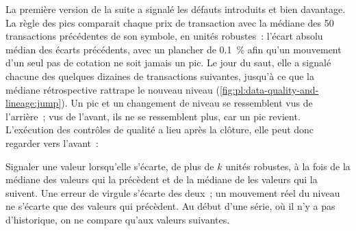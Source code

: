 \begin{omfigure}

\label{fig:pl:data-quality-and-lineage:prices}
\end{omfigure}

La première version de la suite a signalé les défauts introduits et bien davantage. La règle des pics comparait chaque prix de transaction avec la
médiane des 50 transactions précédentes de son symbole, en unités robustes~: l'écart absolu médian des écarts précédents, avec un
plancher de 0.1~\% afin qu'un mouvement d'un seul pas de cotation ne soit jamais un pic. Le jour du saut, elle a signalé chacune des quelques dizaines de transactions suivantes, jusqu'à ce que la médiane rétrospective rattrape le
nouveau niveau (\cref{fig:pl:data-quality-and-lineage:jump}). Un pic et un changement de niveau se ressemblent vus de l'arrière~; vus de l'avant, ils
ne se ressemblent plus, car un pic revient. L'exécution des contrôles de qualité a lieu après la clôture, elle peut donc regarder vers l'avant~:

\begin{method}\label{met:pl:data-quality-and-lineage:spike}
Signaler une valeur lorsqu'elle s'écarte, de plus de $k$ unités robustes, à la fois de la médiane des valeurs qui la précèdent et de la médiane de
les valeurs qui la suivent. Une erreur de virgule s'écarte des deux~; un mouvement réel du niveau ne s'écarte que des valeurs qui précèdent. Au
début d'une série, où il n'y a pas d'historique, on ne compare qu'aux valeurs suivantes.
\end{method}

